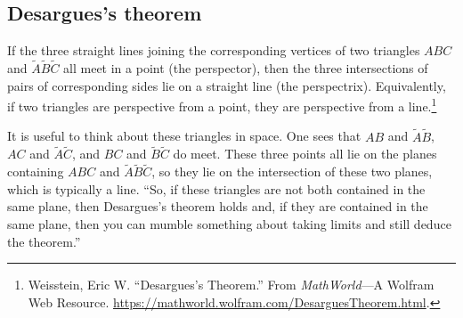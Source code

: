 \documentclass[11pt, oneside,margin=1in]{article}
\begin{document}
\subsection{Desargues's theorem}
\begin{theorem}[Desargues]\label{}\text{}
If the three straight lines joining the corresponding vertices of two triangles $ABC$ and $\tilde A\tilde B\tilde C$ all meet in a point (the perspector), then the three intersections of pairs of corresponding sides lie on a straight line (the perspectrix). Equivalently, if two triangles are perspective from a point, they are perspective from a line.\footnote{Weisstein, Eric W. ``Desargues's Theorem.'' From \textsl{MathWorld}---A Wolfram Web Resource. \url{https://mathworld.wolfram.com/DesarguesTheorem.html}.}
\end{theorem}

It is useful to think about these triangles in space. One sees that $AB$ and $\tilde A\tilde B$, $AC$ and $\tilde A\tilde C$, and $BC$ and $\tilde B\tilde C$ do meet. These three points all lie on the planes containing $ABC$ and $\tilde A\tilde B\tilde C$, so they lie on the intersection of these two planes, which is typically a line. ``So, if these triangles are not both contained in the same plane, then Desargues's theorem holds and, if they are contained in the same plane, then you can mumble something about taking limits and still deduce the theorem.''
\end{document}
